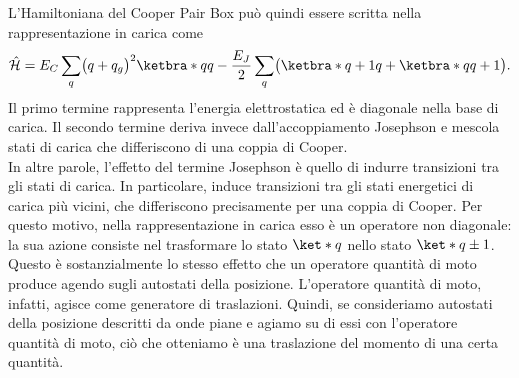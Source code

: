 L'Hamiltoniana del Cooper Pair Box può quindi essere scritta nella rappresentazione in carica come
\begin{equation*}
    \hat{\mathcal{H}}
    =
    E_C
    \sum_q
    \bigl(
        q + q_g
    \bigr)^2
    \ketbra*{q}{q}
    -
    \frac{E_J}{2}
    \sum_q
    \bigl(
        \ketbra*{q+1}{q}
        +
        \ketbra*{q}{q+1}
    \bigr).
\end{equation*}
Il primo termine rappresenta l'energia elettrostatica ed è diagonale nella base di carica. Il secondo termine deriva invece dall'accoppiamento Josephson e mescola stati di carica che differiscono di una coppia di Cooper.\\
In altre parole, l'effetto del termine Josephson è quello di indurre transizioni tra gli stati di carica. In particolare, induce transizioni tra gli stati energetici di carica più vicini, che differiscono precisamente per una coppia di Cooper. Per questo motivo, nella rappresentazione in carica esso è un operatore non diagonale: la sua azione consiste nel trasformare lo stato $\ket*{q}$ nello stato $\ket*{q \pm 1}$.\\
Questo è sostanzialmente lo stesso effetto che un operatore quantità di moto produce agendo sugli autostati della posizione. L'operatore quantità di moto, infatti, agisce come generatore di traslazioni. Quindi, se consideriamo autostati della posizione descritti da onde piane e agiamo su di essi con l'operatore quantità di moto, ciò che otteniamo è una traslazione del momento di una certa quantità.

